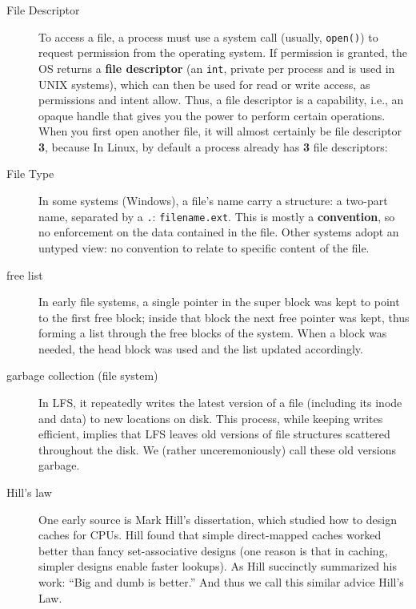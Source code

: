 \begin{description}
\item[File Descriptor] To access a file, a process must use a system call (usually, \texttt{open()}) to request permission from the operating system. If permission is granted, the OS returns a \textbf{file descriptor} (an \texttt{int}, private per process and is used in UNIX systems), which can then be used for read or write access, as permissions and intent allow.  Thus, a file descriptor is a capability, i.e., an opaque handle that gives you the power to perform certain operations.  When you first open another file, it will almost certainly be file descriptor \textbf{3}, because In Linux, by default a process already has \textbf{3} file descriptors:


\item[File Type]  In some systems (Windows), a file's name carry a structure: a two-part name, separated by a \texttt{.}: \texttt{filename.ext}. This is mostly a \textbf{convention}, so no enforcement on the data contained in the file. Other systems adopt an untyped view: no convention to relate to specific content of the file.

\item[free list] In early file systems, a single pointer in the super block was kept to point to the first free block; inside that block the next free pointer was kept, thus forming a list through the free blocks of the system. When a block was needed, the head block was used and the list updated accordingly.

\item[garbage collection (file system)] In LFS, it repeatedly writes the latest version of a file (including its inode and data) to new locations on disk. This process, while keeping writes efficient, implies that LFS leaves old versions of file structures scattered throughout the disk. We (rather unceremoniously) call these old versions garbage.

\item[Hill's law] One early source is Mark Hill's dissertation, which studied how to design caches for CPUs. Hill found that simple direct-mapped caches worked better than fancy set-associative designs (one reason is that in caching, simpler designs enable faster lookups). As Hill succinctly summarized
  his work: ``Big and dumb is better.'' And thus we call this similar advice Hill's Law.


\end{description}
